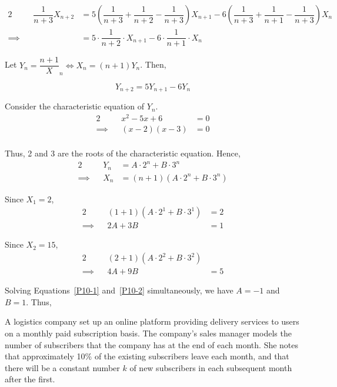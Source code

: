 \documentclass{echw}
\begin{document}
        \begin{alignat*}{2}
            &&\dfrac1{n+3}X_{n+2} &= 5\left(\dfrac1{n+3} + \dfrac1{n+2} - \dfrac1{n+3}\right)X_{n+1} - 6\left(\dfrac1{n+3} + \dfrac1{n+1} - \dfrac1{n+3}\right)X_n\\
            \implies&& &= 5\cdot \dfrac1{n+2} \cdot X_{n+1} - 6\cdot \dfrac1{n+1} \cdot X_n
        \end{alignat*}

        Let $Y_n = \dfrac{n + 1}X_n \iff X_n = (n+1)Y_n$. Then,

        \begin{equation*}
            Y_{n+2} = 5 Y_{n+1} - 6Y_n
        \end{equation*}

        Consider the characteristic equation of $Y_n$.
        \begin{alignat*}{2}
            &&x^2 - 5x + 6 &= 0\\
            \implies&&(x-2)(x-3) &= 0\\
        \end{alignat*}

        Thus, 2 and 3 are the roots of the characteristic equation. Hence,
        \begin{alignat*}{2}
            &&Y_n &= A \cdot 2^n + B \cdot 3^n\\
            \implies&&X_n &= (n+1)\left(A \cdot 2^n + B \cdot 3^n\right)
        \end{alignat*}

        Since $X_1 = 2$,
        \begin{alignat}{2}
            &&(1+1)\left(A \cdot 2^1 + B \cdot 3^1\right) &= 2\nonumber\\
            \implies&&2A + 3B &= 1\label{P10-1}
        \end{alignat}

        Since $X_2 = 15$,
        \begin{alignat}{2}
            &&(2+1)\left(A \cdot 2^2 + B \cdot 3^2\right)\nonumber\\
            \implies&&4A + 9B &= 5\label{P10-2}
        \end{alignat}

        Solving Equations~\ref{P10-1} and~\ref{P10-2} simultaneously, we have $A = -1$ and $B = 1$. Thus,


    \problem{}
        A logistics company set up an online platform providing delivery services to users on a monthly paid subscription basis. The company's sales manager models the number of subscribers that the company has at the end of each month. She notes that approximately 10\% of the existing subscribers leave each month, and that there will be a constant number $k$ of new subscribers in each subsequent month after the first.
\end{document}
